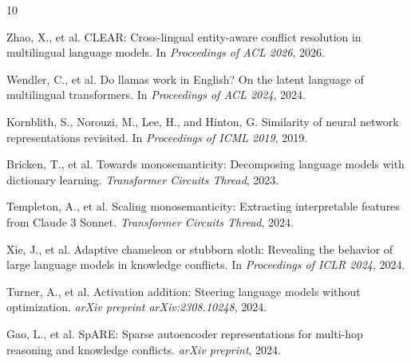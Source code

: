 \documentclass{article}
\begin{document}
\begin{thebibliography}{10}

Zhao, X., et al.
\newblock CLEAR: Cross-lingual entity-aware conflict resolution in multilingual language models.
\newblock In \emph{Proceedings of ACL 2026}, 2026.

Wendler, C., et al.
\newblock Do llamas work in {E}nglish? {O}n the latent language of multilingual transformers.
\newblock In \emph{Proceedings of ACL 2024}, 2024.

Kornblith, S., Norouzi, M., Lee, H., and Hinton, G.
\newblock Similarity of neural network representations revisited.
\newblock In \emph{Proceedings of ICML 2019}, 2019.

Bricken, T., et al.
\newblock Towards monosemanticity: Decomposing language models with dictionary learning.
\newblock \emph{Transformer Circuits Thread}, 2023.

Templeton, A., et al.
\newblock Scaling monosemanticity: Extracting interpretable features from {C}laude 3 {S}onnet.
\newblock \emph{Transformer Circuits Thread}, 2024.

Xie, J., et al.
\newblock Adaptive chameleon or stubborn sloth: Revealing the behavior of large language models in knowledge conflicts.
\newblock In \emph{Proceedings of ICLR 2024}, 2024.

Turner, A., et al.
\newblock Activation addition: Steering language models without optimization.
\newblock \emph{arXiv preprint arXiv:2308.10248}, 2024.

Gao, L., et al.
\newblock SpARE: Sparse autoencoder representations for multi-hop reasoning and knowledge conflicts.
\newblock \emph{arXiv preprint}, 2024.

\end{thebibliography}
\end{document}
